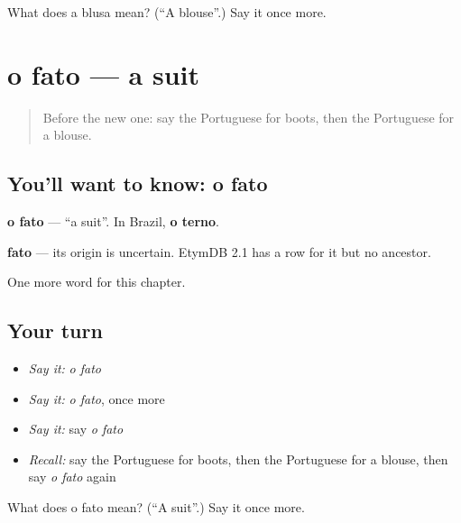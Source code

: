\begin{tcolorbox}[breakable,colback=teal!4,colframe=teal!35!black,title={Before you move on}]
What does a blusa mean? (\textquotedblleft{}A blouse\textquotedblright{}.) Say it once more.
\end{tcolorbox}
\section[o fato]{o fato — a suit}

\label{lesson:PT-C104-fato}



\begin{quote}
Before the new one: say the Portuguese for boots, then the Portuguese for a blouse.
\end{quote}

\subsection*{You'll want to know: o fato}
\textbf{o fato} — \textquotedblleft{}a suit\textquotedblright{}. In Brazil, \textbf{o terno}.

\begin{cousinweb}
\textbf{fato} — its origin is uncertain. EtymDB 2.1 has a row for it but no ancestor.
\end{cousinweb}

\begin{grammarlens}[title={What you've built}]
One more word for this chapter.
\end{grammarlens}

\subsection*{Your turn}
\begin{itemize}
\raggedright
  \item \emph{Say it:} \emph{o fato}
  \item \emph{Say it:} \emph{o fato}, once more
  \item \emph{Say it:} say \emph{o fato}
  \item \emph{Recall:} say the Portuguese for boots, then the Portuguese for a blouse, then say \emph{o fato} again
\end{itemize}

\begin{tcolorbox}[breakable,colback=teal!4,colframe=teal!35!black,title={Before you move on}]
What does o fato mean? (\textquotedblleft{}A suit\textquotedblright{}.) Say it once more.
\end{tcolorbox}

